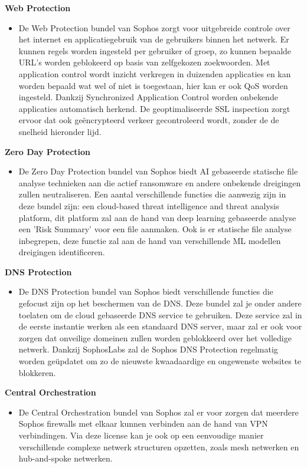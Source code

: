 \textbf{Web Protection}
\begin{itemize}[label=\textbullet]
    \item De Web Protection bundel van Sophos zorgt voor uitgebreide controle over het internet en applicatiegebruik van de gebruikers binnen het netwerk. Er kunnen regels worden ingesteld per gebruiker of groep, zo kunnen bepaalde URL's worden geblokeerd op basis van zelfgekozen zoekwoorden. Met application control wordt inzicht verkregen in duizenden applicaties en kan worden bepaald wat wel of niet is toegestaan, hier kan er ook QoS worden ingesteld. Dankzij Synchronized Application Control worden onbekende applicaties automatisch herkend. De geoptimaliseerde SSL inspection zorgt ervoor dat ook geëncrypteerd verkeer gecontroleerd wordt, zonder de de snelheid hieronder lijd.
\end{itemize}

\textbf{Zero Day Protection}
\begin{itemize}[label=\textbullet]
    \item De Zero Day Protection bundel van Sophos biedt AI gebaseerde statische file analyse technieken aan die actief ransomware en andere onbekende dreigingen zullen neutraliseren. Een aantal verschillende functies die aanwezig zijn in deze bundel zijn: een cloud-based threat intelligence and threat analysis platform, dit platform zal aan de hand van deep learning gebaseerde analyse een 'Risk Summary' voor een file aanmaken. Ook is er statische file analyse inbegrepen, deze functie zal aan de hand van verschillende ML modellen dreigingen identificeren.
\end{itemize}

\textbf{DNS Protection}
\begin{itemize}[label=\textbullet]
    \item De DNS Protection bundel van Sophos biedt verschillende functies die gefocust zijn op het beschermen van de DNS. Deze bundel zal je onder andere toelaten om de cloud gebaseerde DNS service te gebruiken. Deze service zal in de eerste instantie werken als een standaard DNS server, maar zal er ook voor zorgen dat onveilige domeinen zullen worden geblokkeerd over het volledige netwerk. Dankzij SophosLabs zal de Sophos DNS Protection regelmatig worden geüpdatet om zo de nieuwste kwaadaardige en ongewenste websites te blokkeren.
\end{itemize}

\textbf{Central Orchestration}
\begin{itemize}[label=\textbullet]
    \item De Central Orchestration bundel van Sophos zal er voor zorgen dat meerdere Sophos firewalls met elkaar kunnen verbinden aan de hand van VPN verbindingen. Via deze license kan je ook op een eenvoudige manier verschillende complexe netwerk structuren opzetten, zoals mesh netwerken en hub-and-spoke netwerken.
\end{itemize}

